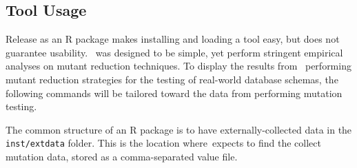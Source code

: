 \subsection{Tool Usage}





Release as an R package makes installing and loading a tool easy, but does not guarantee usability.
\mr~was designed to be simple, yet perform stringent empirical analyses on mutant reduction techniques. To
display the results from \mr~performing mutant reduction strategies for the testing of real-world database schemas,
the following commands will be tailored toward the data from performing mutation testing.

The common structure of an R package is to have externally-collected data in the \texttt{inst/extdata} folder.
This is the location where~\mr expects to find the collect mutation data, stored as a comma-separated value file.






